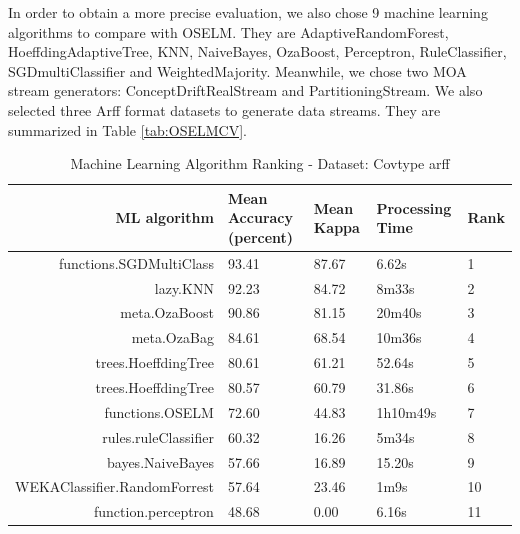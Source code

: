 \documentclass[a4paper, 14pt]{extarticle}
\begin{document}
\par In order to obtain a more precise evaluation, we also chose 9 machine learning algorithms to compare with OSELM. They are AdaptiveRandomForest, HoeffdingAdaptiveTree, KNN, NaiveBayes, OzaBoost, Perceptron, RuleClassifier, SGDmultiClassifier and WeightedMajority. Meanwhile, we chose two MOA stream generators: ConceptDriftRealStream and PartitioningStream.  We also selected three Arff format datasets to generate data streams. They are summarized in Table \ref{tab:OSELMCV}.
\begin{table}[thb]
\caption{\label{tab:OSELMCovtRank}Machine Learning Algorithm Ranking  - Dataset: Covtype arff }
\footnotesize
{\centering \begin{tabular}{rllll}\\
\hline
ML algorithm & Mean Accuracy (percent) & Mean Kappa & Processing Time & Rank\\

\hline
functions.SGDMultiClass & 93.41 & 87.67  &   6.62s & 1\\
lazy.KNN &  92.23 &  84.72 &   8m33s & 2\\
meta.OzaBoost &  90.86 &  81.15 &   20m40s & 3\\
meta.OzaBag &  84.61 &  68.54 &  10m36s & 4\\
trees.HoeffdingTree &  80.61 &  61.21 &  52.64s & 5\\
trees.HoeffdingTree &   80.57 &  60.79 &  31.86s & 6\\
functions.OSELM &  72.60 &  44.83 &  1h10m49s & 7\\
rules.ruleClassifier & 60.32 &  16.26 &  5m34s & 8\\
bayes.NaiveBayes & 57.66 &  16.89 &  15.20s & 9\\
WEKAClassifier.RandomForrest & 57.64 &   23.46 &  1m9s & 10\\
function.perceptron & 48.68 &   0.00 &  6.16s & 11\\
\hline
\end{tabular} \footnotesize \par}
\end{table}
\end{document}
